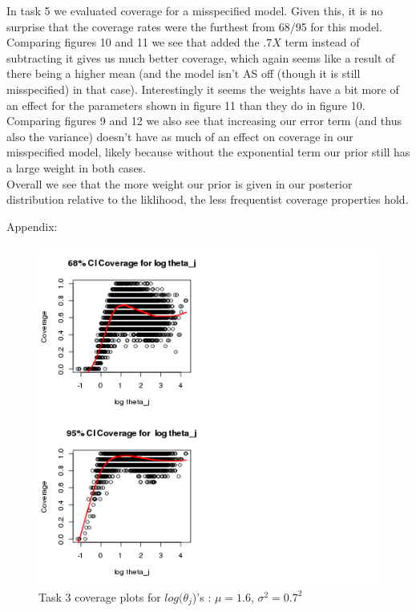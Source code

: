 \documentclass[paper=a4, fontsize=11pt]{scrartcl}
\begin{document}
\begin{enumerate}
	In task 5  we evaluated coverage for a misspecified model. Given this, it is no surprise that the coverage rates were the furthest from 68/95 for this model. Comparing figures 10 and 11 we see that added the $.7X$ term instead of subtracting it gives us much better coverage, which again seems like a result of there being a higher mean (and the model isn't AS off (though it is still misspecified) in that case). Interestingly it seems the weights have a bit more of an effect for the parameters shown in figure 11 than they do in figure 10. Comparing figures 9 and 12 we also see that increasing our error term (and thus also the variance) doesn't have as much of an effect on coverage in our misspecified model, likely because without the exponential term our prior still has a large weight in both cases.\\
	Overall we see that the more weight our prior is given in our posterior distribution relative to the liklihood, the less frequentist coverage properties hold.
  \end{enumerate}
\clearpage
Appendix: \\
\begin{figure}[h!]
  \caption{Task 3 coverage plots for $log(\theta_{j}$)'s : $\mu = 1.6$, $\sigma^2 = 0.7^2$}
  \centering
	\includegraphics[scale=1, trim = 0 0 200 0]{keskici_wxiao_ps2_task3_plot1.png}
\end{figure}
\end{document}
